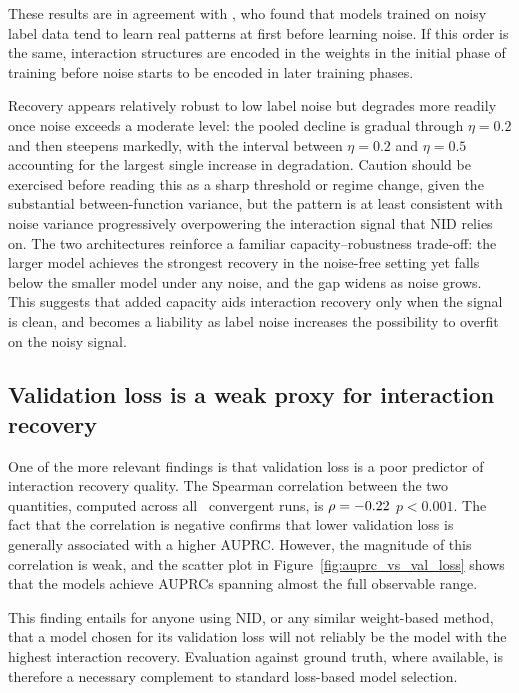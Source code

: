 \documentclass{article}
\begin{document}
These results are in agreement with \cite{arpit2017closerlookmemorizationdeep}, who found that models trained on noisy label data tend to learn real patterns at first before learning noise. If this order is the same, interaction structures are encoded in the weights in the initial phase of training before noise starts to be encoded in later training phases.

Recovery appears relatively robust to low label noise but degrades more readily once noise
exceeds a moderate level: the pooled decline is gradual through $\eta = 0.2$ and then
steepens markedly, with the interval between $\eta = 0.2$ and $\eta = 0.5$ accounting for the
largest single increase in degradation. Caution should be exercised before reading this as a sharp
threshold or regime change, given the substantial between-function variance, but the pattern
is at least consistent with noise variance progressively overpowering the interaction signal
that NID relies on. The two architectures reinforce a familiar capacity--robustness trade-off:
the larger model achieves the strongest recovery in the noise-free setting yet falls below
the smaller model under any noise, and the gap widens as noise grows. This suggests that
added capacity aids interaction recovery only when the signal is clean, and becomes a
liability as label noise increases the possibility to overfit on the noisy signal.
\subsection*{Validation loss is a weak proxy for interaction recovery}

One of the more relevant findings is that validation loss is a poor predictor of interaction recovery quality. The Spearman correlation between the two quantities, computed across all \statRetainedRuns\ convergent runs, is $\rho = -0.22$ \(p < 0.001\). The fact that the correlation is negative confirms that lower validation loss is generally associated with a higher AUPRC. However, the magnitude of this correlation is weak, and the scatter plot in Figure~\ref{fig:auprc_vs_val_loss} shows that the models achieve AUPRCs spanning almost the full observable range.

This finding entails for anyone using NID, or any similar weight-based method, that a model chosen for its validation loss will not reliably be the model with the highest interaction recovery. Evaluation against ground truth, where available, is therefore a necessary complement to standard loss-based model selection.
\end{document}
